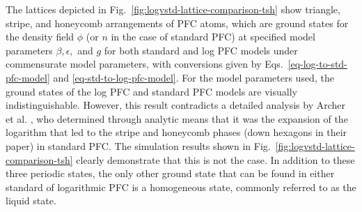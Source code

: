 %
The lattices depicted in Fig.~\ref{fig:logvstd-lattice-comparison-tsh} show triangle, stripe, and honeycomb arrangements of PFC atoms, which are ground states for the density field $\phi$ (or $n$ in the case of standard PFC) at specified model parameters $\beta, \epsilon,$ and $g$ for both standard and log PFC models under commensurate model parameters, with conversions given by Eqs.~\ref{eq-log-to-std-pfc-model} and \ref{eq-std-to-log-pfc-model}.  For the model parameters used, the ground states of the log PFC and standard PFC models are visually indistinguishable.  However, this result contradicts a detailed analysis by Archer et al. \cite{archer2012}, who determined through analytic means that it was the expansion of the logarithm that led to the stripe and honeycomb phases (down hexagons in their paper) in standard PFC.  The simulation results shown in Fig.~\ref{fig:logvstd-lattice-comparison-tsh} clearly demonstrate that this is not the case.  In addition to these three periodic states, the only other ground state that can be found in either standard of logarithmic PFC is a homogeneous state, commonly referred to as the liquid state.

